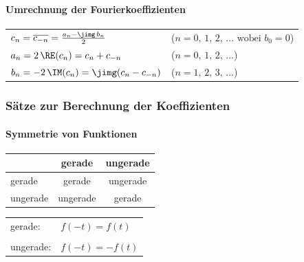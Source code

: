 \smallskip



\paragraph{Umrechnung der Fourierkoeffizienten}

\renewcommand{\arraystretch}{1.4}
\begin{tabular}{ll}
    $c_n = \overline{c_{-n}} = \frac{a_n - \jimg \, b_n }{2}$   & ($n = 0, \, 1, \, 2, \, \ldots \text{ wobei } b_0 = 0$)   \\
    $a_n = 2 \, \RE(c_n) = c_n + c_{-n}$                        & ($n = 0, \, 1, \, 2, \, \ldots$)                          \\
    $b_n = -2 \, \IM(c_n) = \jimg (c_n - c_{-n})$               & ($n = 1, \, 2, \, 3, \, \ldots$) 
\end{tabular}
\renewcommand{\arraystretch}{1}

\columnbreak


\subsubsection{Sätze zur Berechnung der Koeffizienten}

\paragraph{Symmetrie von Funktionen}

\begin{minipage}{0.48\linewidth}
    \begin{tabular}{l | c | c}
                    & gerade    & ungerade  \\ 
        \hline
        gerade      & gerade    & ungerade  \\
        \hline
        ungerade    & ungerade  & gerade    \\
    \end{tabular}
\end{minipage}
\hfill
\begin{minipage}{0.43\linewidth}
    \begin{tabular}{ll}
        gerade:     &  $f(-t) = f(t)$ \\
        \\ 
        ungerade:   & $f(-t) = - f(t)$ 
    \end{tabular}
\end{minipage}

